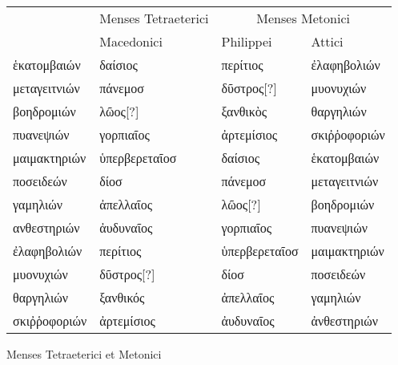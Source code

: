 \begin{tabular}{@{}l l  ll@{}}
\toprule
 &
 \multicolumn{1}{c}{Menses Tetraeterici} &
 \multicolumn{2}{c}{Menses Metonici} \\
\cmidrule(lr){2-2} \cmidrule(lr){3-4}
 ~ & Macedonici &  Philippei & Attici \\
\midrule
 \textgreek{ἑκατομβαιών} &
 \textgreek{δαίσιος} &
 \textgreek{περίτιος} &
 \textgreek{ἐλαφηβολιών}
\\
 \textgreek{μεταγειτνιών} &
 \textgreek{πάνεμοσ} &
 \textgreek{δῦστρος[?]} &
 \textgreek{μυονυχιών}
\\
 \textgreek{βοηδρομιών} &
 \textgreek{λῶος[?]} & %
 \textgreek{ξανθικὸς} &
 \textgreek{θαργηλιών}
\\
\midrule
 \textgreek{πυανεψιών} &
 \textgreek{γορπιαῖος} &
 \textgreek{ἀρτεμίσιος} &
 \textgreek{σκιῤῥοφοριών}
\\
 \textgreek{μαιμακτηριών} &
 \textgreek{ὑπερβερεταῖοσ} &
 \textgreek{δαίσιος} &
 \textgreek{ἑκατομβαιών}
\\
 \textgreek{ποσειδεών} &
 \textgreek{δίοσ} &
 \textgreek{πάνεμοσ} &
 \textgreek{μεταγειτνιών}
\\
\midrule
 \textgreek{γαμηλιών} &
 \textgreek{ἀπελλαῖος} &
 \textgreek{λῶος[?]} &
 \textgreek{βοηδρομιών}
\\
 \textgreek{ανθεστηριών} &
 \textgreek{ἀυδυναῖος} &
 \textgreek{γορπιαῖος} &
 \textgreek{πυανεψιών}
\\
 \textgreek{ἐλαφηβολιών} &
 \textgreek{περίτιος} &
 \textgreek{ὑπερβερεταῖοσ} &
 \textgreek{μαιμακτηριών}
\\
\midrule
 \textgreek{μυονυχιών} &
 \textgreek{δῦστρος[?]} & %
 \textgreek{δίοσ} &
 \textgreek{ποσειδεών}
\\
 \textgreek{θαργηλιών} &
 \textgreek{ξανθικός} &
 \textgreek{ἀπελλαῖος} &
 \textgreek{γαμηλιών}
\\
 \textgreek{σκιῤῥοφοριών} &
 \textgreek{ἀρτεμίσιος} &
 \textgreek{ἀυδυναῖος} &
 \textgreek{ἀνθεστηριών}
\\
\bottomrule
\end{tabular}
%
\caption{Menses Tetraeterici et Metonici}
\label{tab:p84a}
%